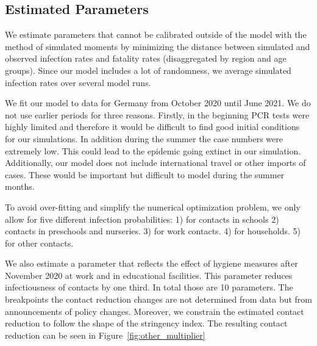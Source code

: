 \subsection{Estimated Parameters}
\label{subsec:estimated_params}


\FloatBarrier

We estimate parameters that cannot be calibrated outside of the model with the
method of simulated moments \citep{McFadden1989} by minimizing the distance between
simulated and observed infection rates and fatality rates (disaggregated by region
and age groups). Since our model includes a lot of randomness, we
average simulated infection rates over several model runs.

We fit our model to data for Germany from October 2020 until June 2021. We do not use
earlier periods for three reasons. Firstly, in the beginning PCR tests were highly
limited and therefore it would be difficult to find good initial conditions for our
simulations. In addition during the summer the case numbers were extremely low. This
could lead to the epidemic going extinct in our simulation. Additionally, our model does
not include international travel or other imports of cases. These would be important but
difficult to model during the summer months.


To avoid over-fitting and simplify the numerical optimization problem, we only allow for
five different infection probabilities: 1) for contacts in schools 2) contacts in
preschools and nurseries. 3) for work contacts. 4) for households. 5) for other
contacts.

We also estimate a parameter that reflects the effect of hygiene measures
after November 2020 at work and in educational facilities. This parameter reduces
infectiousness of contacts by one third. In total those are 10 parameters. The
breakpoints the contact reduction changes are not determined from data but from
announcements of policy changes. Moreover, we constrain the estimated contact reduction
to follow the shape of the stringency index. The resulting contact reduction can be
seen in Figure~\ref{fig:other_multiplier}


